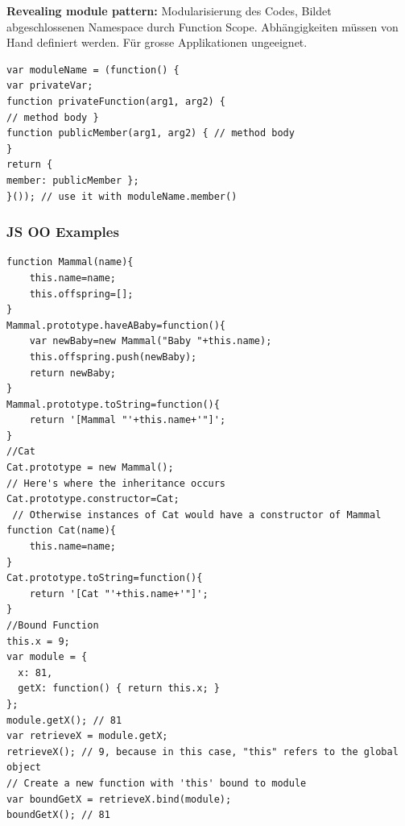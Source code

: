 \begin{multicols*}{4}
\textbf{\color{MidnightBlue}Revealing module pattern:} Modularisierung des Codes, Bildet
abgeschlossenen Namespace durch
Function Scope. Abhängigkeiten müssen von Hand definiert
werden. Für grosse Applikationen ungeeignet.
 \begin{verbatim}
var moduleName = (function() {
var privateVar;
function privateFunction(arg1, arg2) {
// method body }
function publicMember(arg1, arg2) { // method body
}
return {
member: publicMember };
}()); // use it with moduleName.member()
\end{verbatim}
\subsubsection{JS OO Examples}
 \begin{verbatim}
function Mammal(name){ 
	this.name=name;
	this.offspring=[];
} 
Mammal.prototype.haveABaby=function(){ 
	var newBaby=new Mammal("Baby "+this.name);
	this.offspring.push(newBaby);
	return newBaby;
} 
Mammal.prototype.toString=function(){ 
	return '[Mammal "'+this.name+'"]';
} 
//Cat
Cat.prototype = new Mammal();        
// Here's where the inheritance occurs 
Cat.prototype.constructor=Cat;      
 // Otherwise instances of Cat would have a constructor of Mammal 
function Cat(name){ 
	this.name=name;
} 
Cat.prototype.toString=function(){ 
	return '[Cat "'+this.name+'"]';
}
//Bound Function
this.x = 9; 
var module = {
  x: 81,
  getX: function() { return this.x; }
};
module.getX(); // 81
var retrieveX = module.getX;
retrieveX(); // 9, because in this case, "this" refers to the global object
// Create a new function with 'this' bound to module
var boundGetX = retrieveX.bind(module);
boundGetX(); // 81
\end{verbatim}

\end{multicols*}
